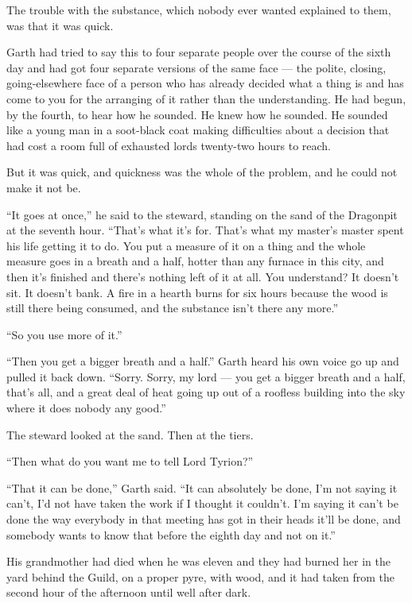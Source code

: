 The trouble with the substance, which nobody ever wanted explained to them, was that it was quick.

Garth had tried to say this to four separate people over the course of the sixth day and had got four separate versions of the same face — the polite, closing, going-elsewhere face of a person who has already decided what a thing is and has come to you for the arranging of it rather than the understanding. He had begun, by the fourth, to hear how he sounded. He knew how he sounded. He sounded like a young man in a soot-black coat making difficulties about a decision that had cost a room full of exhausted lords twenty-two hours to reach.

But it was quick, and quickness was the whole of the problem, and he could not make it not be.

“It goes at once,” he said to the steward, standing on the sand of the Dragonpit at the seventh hour. “That’s what it’s for. That’s what my master’s master spent his life getting it to do. You put a measure of it on a thing and the whole measure goes in a breath and a half, hotter than any furnace in this city, and then it’s finished and there’s nothing left of it at all. You understand? It doesn’t sit. It doesn’t bank. A fire in a hearth burns for six hours because the wood is still there being consumed, and the substance isn’t there any more.”

“So you use more of it.”

“Then you get a bigger breath and a half.” Garth heard his own voice go up and pulled it back down. “Sorry. Sorry, my lord — you get a bigger breath and a half, that’s all, and a great deal of heat going up out of a roofless building into the sky where it does nobody any good.”

The steward looked at the sand. Then at the tiers.

“Then what do you want me to tell Lord Tyrion?”

“That it can be done,” Garth said. “It can absolutely be done, I’m not saying it can’t, I’d not have taken the work if I thought it couldn’t. I’m saying it can’t be done the way everybody in that meeting has got in their heads it’ll be done, and somebody wants to know that before the eighth day and not on it.”

\sceneBreak

His grandmother had died when he was eleven and they had burned her in the yard behind the Guild, on a proper pyre, with wood, and it had taken from the second hour of the afternoon until well after dark.

